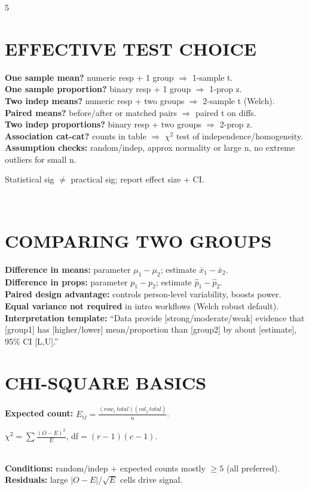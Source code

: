 \documentclass[10pt,landscape,letterpaper]{article}
\newcommand{\concept}[1]{\textcolor{conceptcyan}{\textbf{#1}}}
\newcommand{\process}[1]{\textcolor{processpurple}{\textbf{#1}}}
\newcommand{\category}[1]{\textcolor{categorygreen}{\textbf{#1}}}
\newcommand{\important}[1]{{\setlength{\fboxsep}{1pt}\colorbox{highlightyellow}{\parbox{\dimexpr\linewidth-2\fboxsep\relax}{#1}}}}
\begin{document}
\begin{multicols}{5}
\section{EFFECTIVE TEST CHOICE}
\process{One sample mean?} numeric resp + 1 group $\Rightarrow$ 1-sample t.\\
\process{One sample proportion?} binary resp + 1 group $\Rightarrow$ 1-prop z.\\
\process{Two indep means?} numeric resp + two groups $\Rightarrow$ 2-sample t (Welch).\\
\process{Paired means?} before/after or matched pairs $\Rightarrow$ paired t on diffs.\\
\process{Two indep proportions?} binary resp + two groups $\Rightarrow$ 2-prop z.\\
\process{Association cat-cat?} counts in table $\Rightarrow$ $\chi^2$ test of independence/homogeneity.\\
\concept{Assumption checks:} random/indep, approx normality or large n, no extreme outliers for small n.\\
\important{Statistical sig $\neq$ practical sig; report effect size + CI.}\\
\section{COMPARING TWO GROUPS}
\concept{Difference in means:} parameter $\mu_1-\mu_2$; estimate $\bar x_1-\bar x_2$.\\
\concept{Difference in props:} parameter $p_1-p_2$; estimate $\hat p_1-\hat p_2$.\\
\category{Paired design advantage:} controls person-level variability, boosts power.\\
\concept{Equal variance not required} in intro workflows (Welch robust default).\\
\process{Interpretation template:} ``Data provide [strong/moderate/weak] evidence that [group1] has [higher/lower] mean/proportion than [group2] by about [estimate], 95\% CI [L,U].''\\
\section{CHI-SQUARE BASICS}
\concept{Expected count:} $E_{ij}=\frac{(row_i\ total)(col_j\ total)}{n}$.\\
\important{$\chi^2=\sum\frac{(O-E)^2}{E}$, df$=(r-1)(c-1)$.}\\
\concept{Conditions:} random/indep + expected counts mostly $\ge5$ (all preferred).\\
\concept{Residuals:} large $|O-E|/\sqrt E$ cells drive signal.\\

\end{multicols}
\end{document}
